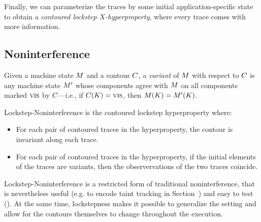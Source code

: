 \documentclass[conference]{IEEEtran}
\begin{document}
Finally, we can parameterize the traces by some initial
application-specific state to obtain a {\em contoured lockstep
  $X$-hyperproperty}, where every trace comes with more information.

\subsection{Noninterference}


Given a machine state $M$ and a contour $C$, a {\em
  variant} of $M$ with respect to $C$ is any machine state
$M'$ whose components agree with $M$ on all components marked
$\textsc{vis}$ by $C$---i.e., if $C(K) = \textsc{vis}$, then
$M(K) = M'(K)$.


Lockstep-Noninterference is the contoured lockstep hyperproperty
where:
\begin{itemize}
\item For each pair of contoured traces in the hyperproperty, the
  contour is invariant along each trace.
\item For each pair of contoured traces in the hyperproperty, if the
  initial elements of the traces are variants, then the observervations
  of the two traces coincide.
\end{itemize}


Lockstep-Noninterference is a restricted form of traditional
noninterference, that is nevertheless useful (e.g. to encode taint
tracking in Section~) and easy to test ().
At the same time, lockstepness makes it possible to generalize the
setting and allow for the contours themselves to change throughout the
execution. 

\end{document}
